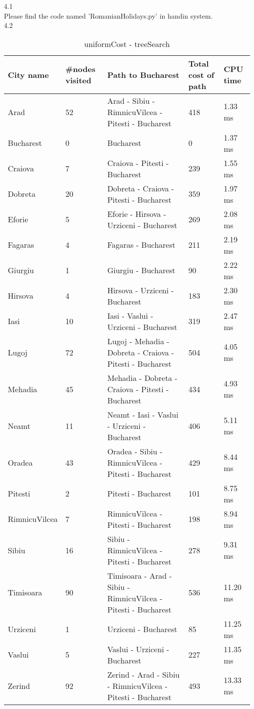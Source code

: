 \documentclass[a4paper]{article}
\begin{document}
4.1\\
Please find the code named 'RomanianHolidays.py' in handin system.\\
4.2\\
\begin {table}[H]
\caption {uniformCost - treeSearch}
\begin{center}
\begin{tabular}{ | l | l |  p{5cm} | l | l |} \hline
City name & \multicolumn{1}{l|}{\#nodes visited} & \multicolumn{1}{l|}{Path to Bucharest} & \multicolumn{1}{l|}{Total cost of path} & \multicolumn{1}{l|}{CPU time} \\ \hline
Arad & 52 & Arad - Sibiu - RimnicuVilcea - Pitesti - Bucharest & 418 & 1.33 ms \\ \hline
Bucharest & 0 & Bucharest & 0 & 1.37 ms \\ \hline
Craiova & 7 & Craiova - Pitesti - Bucharest & 239 & 1.55 ms \\ \hline
Dobreta & 20 & Dobreta - Craiova - Pitesti - Bucharest & 359 & 1.97 ms \\ \hline
Eforie & 5 & Eforie - Hirsova - Urziceni - Bucharest & 269 & 2.08 ms \\ \hline
Fagaras & 4 & Fagaras - Bucharest & 211 & 2.19 ms \\ \hline
Giurgiu & 1 & Giurgiu - Bucharest & 90 & 2.22 ms \\ \hline
Hirsova & 4 & Hirsova - Urziceni - Bucharest & 183 & 2.30 ms \\ \hline
Iasi & 10 & Iasi - Vaslui - Urziceni - Bucharest & 319 & 2.47 ms \\ \hline
Lugoj & 72 & Lugoj - Mehadia - Dobreta - Craiova - Pitesti - Bucharest & 504 & 4.05 ms \\ \hline
Mehadia & 45 & Mehadia - Dobreta - Craiova - Pitesti - Bucharest & 434 & 4.93 ms \\ \hline
Neamt & 11 & Neamt - Iasi - Vaslui - Urziceni - Bucharest & 406 & 5.11 ms \\ \hline
Oradea & 43 & Oradea - Sibiu - RimnicuVilcea - Pitesti - Bucharest & 429 & 8.44 ms \\ \hline
Pitesti & 2 & Pitesti - Bucharest & 101 & 8.75 ms \\ \hline
RimnicuVilcea & 7 & RimnicuVilcea - Pitesti - Bucharest & 198 & 8.94 ms \\ \hline
Sibiu & 16 & Sibiu - RimnicuVilcea - Pitesti - Bucharest & 278 & 9.31 ms \\ \hline
Timisoara & 90 & Timisoara - Arad - Sibiu - RimnicuVilcea - Pitesti - Bucharest & 536 & 11.20 ms \\ \hline
Urziceni & 1 & Urziceni - Bucharest & 85 & 11.25 ms \\ \hline
Vaslui & 5 & Vaslui - Urziceni - Bucharest & 227 & 11.35 ms \\ \hline
Zerind & 92 & Zerind - Arad - Sibiu - RimnicuVilcea - Pitesti - Bucharest & 493 & 13.33 ms \\ \hline
\end{tabular}
\end{center}
\end {table}
\end{document}
